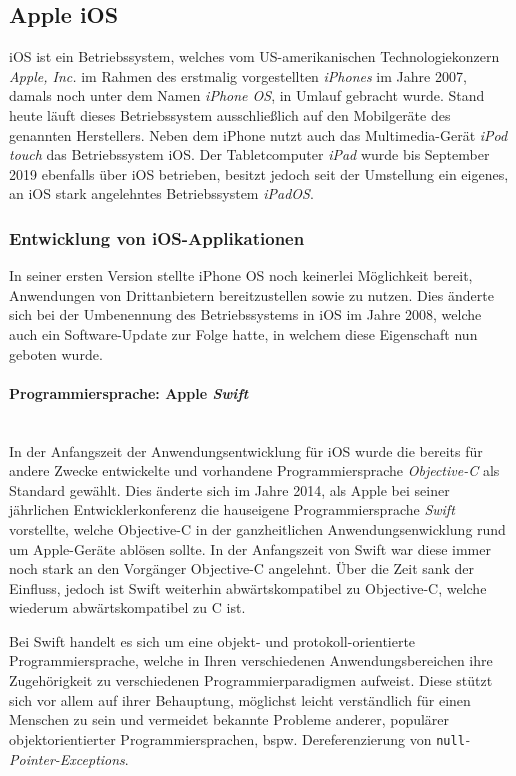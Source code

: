 

\subsection{Apple iOS}

iOS ist ein Betriebssystem, welches vom US-amerikanischen Technologiekonzern \textit{Apple, Inc.} im Rahmen des erstmalig vorgestellten \textit{iPhones} im Jahre 2007, damals noch unter dem Namen \textit{iPhone OS}, in Umlauf gebracht wurde. Stand heute läuft dieses Betriebssystem ausschließlich auf den Mobilgeräte des genannten Herstellers. Neben dem iPhone nutzt auch das Multimedia-Gerät \textit{iPod touch} das Betriebssystem iOS. Der Tabletcomputer \textit{iPad} wurde bis September 2019 ebenfalls über iOS betrieben, besitzt jedoch seit der Umstellung ein eigenes, an iOS stark angelehntes Betriebssystem \textit{iPadOS}.

\subsubsection{Entwicklung von iOS-Applikationen}

In seiner ersten Version stellte iPhone OS noch keinerlei Möglichkeit bereit, Anwendungen von Drittanbietern bereitzustellen sowie zu nutzen. Dies änderte sich bei der Umbenennung des Betriebssystems in iOS im Jahre 2008, welche auch ein Software-Update zur Folge hatte, in welchem diese Eigenschaft nun geboten wurde.

\paragraph{Programmiersprache: Apple \textit{Swift}}\mbox{}\\
In der Anfangszeit der Anwendungsentwicklung für iOS wurde die bereits für andere Zwecke entwickelte und vorhandene Programmiersprache \textit{Objective-C} als Standard gewählt. Dies änderte sich im Jahre 2014, als Apple bei seiner jährlichen Entwicklerkonferenz die hauseigene Programmiersprache \textit{Swift} vorstellte, welche Objective-C in der ganzheitlichen Anwendungsenwicklung rund um Apple-Geräte ablösen sollte. In der Anfangszeit von Swift war diese immer noch stark an den Vorgänger Objective-C angelehnt. Über die Zeit sank der Einfluss, jedoch ist Swift weiterhin abwärtskompatibel zu Objective-C, welche wiederum abwärtskompatibel zu C ist.

Bei Swift handelt es sich um eine objekt- und protokoll-orientierte Programmiersprache, welche in Ihren verschiedenen Anwendungsbereichen ihre Zugehörigkeit zu verschiedenen Programmierparadigmen aufweist. Diese stützt sich vor allem auf ihrer Behauptung, möglichst leicht verständlich für einen Menschen zu sein und vermeidet bekannte Probleme anderer, populärer objektorientierter Programmiersprachen, bspw. Dereferenzierung von \texttt{null}\textit{-Pointer-Exceptions}.

